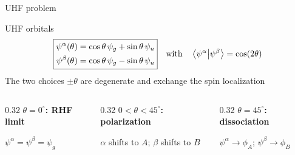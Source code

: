 \documentclass[aspectratio=169,9pt]{beamer}
\begin{document}
\begin{frame}{UHF problem}
	\small
	\begin{block}{UHF orbitals}
    	\begin{equation*}
    		\boxed{
    		\begin{aligned}
    			\psi^\alpha(\theta)
    				&=\cos\theta\,\psi_g+\sin\theta\,\psi_u\\
    			\psi^\beta(\theta)
    				&=\cos\theta\,\psi_g-\sin\theta\,\psi_u
    		\end{aligned}
    		}
    		\qq{with}
    		\braket{\psi^\alpha}{\psi^\beta}=\cos(2\theta)
    	\end{equation*}
    	The two choices $\pm\theta$ are degenerate and exchange the spin localization
	\end{block}

	\vfill
	\begin{columns}[T,onlytextwidth]
		\begin{column}{0.32\textwidth}
			\centering
			\textbf{$\theta=0^\circ$: RHF limit}


			$\psi^\alpha=\psi^\beta=\psi_g$
		\end{column}
		\begin{column}{0.32\textwidth}
			\centering
			\textbf{$0<\theta<45^\circ$: polarization}


			$\alpha$ shifts to $A$; $\beta$ shifts to $B$
		\end{column}
		\begin{column}{0.32\textwidth}
			\centering
			\textbf{$\theta=45^\circ$: dissociation}


			$\psi^\alpha\to\phi_A$; $\psi^\beta\to\phi_B$
		\end{column}
	\end{columns}

	\vspace{0.5em}
	\centering
\end{frame}
\end{document}
